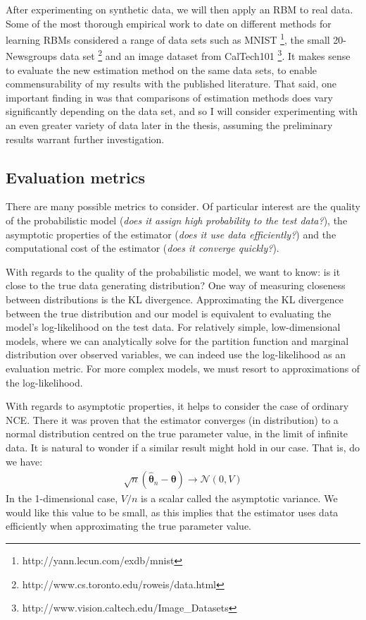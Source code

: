 \documentclass[11pt, oneside]{article}
\newcommand{\thetab}{{\boldsymbol{\theta}}}
\newcommand{\thetaHat}{{\hat{\thetab}}}
\begin{document}
After experimenting on synthetic data, we will then apply an RBM to real data. Some of the most thorough empirical work to date on different methods for learning RBMs \citep{marlin2010inductive} considered a range of data sets such as MNIST \footnote{http://yann.lecun.com/exdb/mnist}, the small 20-Newsgroups data set \footnote{http://www.cs.toronto.edu/roweis/data.html} and an image dataset from CalTech101 \footnote{http://www.vision.caltech.edu/Image\_Datasets}. It makes sense to evaluate the new estimation method on the same data sets, to enable commensurability of my results with the published literature. That said, one important finding in \citep{marlin2010inductive} was that comparisons of estimation methods does vary significantly depending on the data set, and so I will consider experimenting with an even greater variety of data later in the thesis, assuming the preliminary results warrant further investigation.

\subsection{Evaluation metrics}
There are many possible metrics to consider. Of particular interest are the quality of the probabilistic model (\emph{does it assign high probability to the test data?}), the asymptotic properties of the estimator (\emph{does it use data efficiently?}) and the computational cost of the estimator (\emph{does it converge quickly?}).

With regards to the quality of the probabilistic model, we want to know: is it close to the true data generating distribution? One way of measuring closeness between distributions is the KL divergence. Approximating the KL divergence between the true distribution and our model is equivalent to evaluating the model's log-likelihood on the test data. For relatively simple, low-dimensional models, where we can analytically solve for the partition function and marginal distribution over observed variables, we can indeed use the log-likelihood as an evaluation metric. For more complex models, we must resort to approximations of the log-likelihood.

With regards to asymptotic properties, it helps to consider the case of ordinary NCE. There it was proven that the estimator converges (in distribution) to a normal distribution centred on the true parameter value, in the limit of infinite data. It is natural to wonder if a similar result might hold in our case. That is, do we have:
\begin{align}
    \sqrt{n} (\thetaHat_n - \thetab) \rightarrow \mathcal{N}(0, V)
\end{align}
In the 1-dimensional case, $V/n$ is a scalar called the asymptotic variance. We would like this value to be small, as this implies that the estimator uses data efficiently when approximating the true parameter value.
\end{document}
